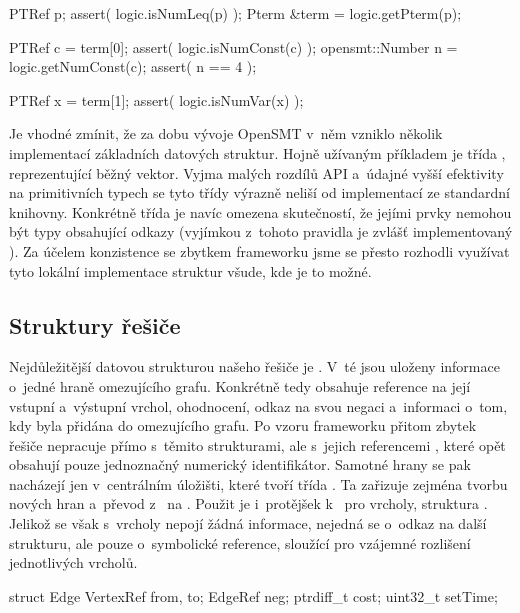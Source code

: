 \begin{code}[label=Příklad práce s~termem p $\approx (4 \leq x)$]
PTRef p;    
assert( logic.isNumLeq(p) );
Pterm &term = logic.getPterm(p);

PTRef c = term[0];
assert( logic.isNumConst(c) );
opensmt::Number n = logic.getNumConst(c);
assert( n == 4 );

PTRef x = term[1];
assert( logic.isNumVar(x) );
\end{code}

Je vhodné zmínit, že za dobu vývoje OpenSMT v~něm vzniklo několik implementací základních datových struktur. Hojně užívaným příkladem je třída , reprezentující běžný vektor. Vyjma malých rozdílů API a~údajné vyšší efektivity na primitivních typech se tyto třídy výrazně neliší od implementací ze standardní knihovny. Konkrétně třída  je navíc omezena skutečností, že jejími prvky nemohou být typy obsahující odkazy (vyjímkou z~tohoto pravidla je zvlášť implementovaný ). Za účelem konzistence se zbytkem frameworku jsme se přesto rozhodli využívat tyto lokální implementace struktur všude, kde je to možné. 

\subsection*{Struktury řešiče}
Nejdůležitější datovou strukturou našeho řešiče je . V~té jsou uloženy informace o~jedné hraně omezujícího grafu. Konkrétně tedy obsahuje reference na její vstupní a~výstupní vrchol, ohodnocení, odkaz na svou negaci a~informaci o~tom, kdy byla přidána do omezujícího grafu. Po vzoru frameworku přitom zbytek řešiče nepracuje přímo s~těmito strukturami, ale s~jejich referencemi , které opět obsahují pouze jednoznačný numerický identifikátor. Samotné hrany se pak nacházejí jen v~centrálním úložišti, které tvoří třída . Ta zařizuje zejména tvorbu nových hran a~převod z~ na . Použit je i~protějšek k~ pro vrcholy, struktura . Jelikož se však s~vrcholy nepojí žádná informace, nejedná se o~odkaz na další strukturu, ale pouze o~symbolické reference, sloužící pro vzájemné rozlišení jednotlivých vrcholů.

\begin{code}[label=Deklarace struktury Edge]
struct Edge {
    VertexRef from, to;    
    EdgeRef neg;           
    ptrdiff_t cost;
    uint32_t setTime;
}
\end{code}

